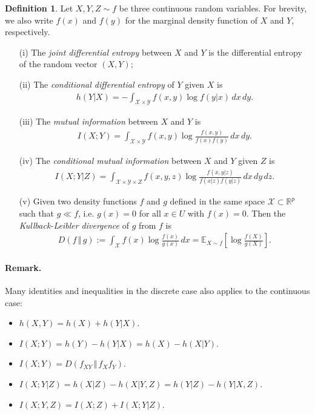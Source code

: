 \documentclass{article}
\numberwithin{equation}{section}
\newcommand{\E}{\mathbb{E}}
\newcommand{\bbR}{\mathbb{R}}
\renewcommand{\cal}{\mathcal}
\theoremstyle{plain}
\theoremstyle{definition}
\newtheorem{definition}[theorem]{Definition}
\begin{document}
\begin{definition}
Let $X,Y,Z\sim f$ be three continuous random variables. For brevity, we also write $f(x)$ and $f(y)$ for the marginal density function of $X$ and $Y$, respectively.
\begin{itemize}
\item[(i)] The \textit{joint differential entropy} between $X$ and $Y$ is the differential entropy of the random vector $(X,Y)$;
\item[(ii)] The \textit{conditional differential entropy} of $Y$ given $X$ is
\begin{align*}
	h(Y|X)=-\int_{\cal{X}\times\cal{Y}}f(x,y)\log f(y|x)\,dx\,dy.
\end{align*}
\item[(iii)] The \textit{mutual information} between $X$ and $Y$ is
\begin{align*}
	I(X;Y)=\int_{\cal{X}\times\cal{Y}}f(x,y)\log\frac{f(x,y)}{f(x)f(y)}\,dx\,dy.
\end{align*}
\item[(iv)] The \textit{conditional mutual information} between $X$ and $Y$ given $Z$ is
\begin{align*}
	I(X;Y|Z)=\int_{\cal{X}\times\cal{Y}\times{Z}}f(x,y,z)\log\frac{f(x,y|z)}{f(x|z)f(y|z)}\,dx\,dy\,dz.
\end{align*}
\item[(v)] Given two density functions $f$ and $g$ defined in the same space $\cal{X}\subset\bbR^p$ such that $g\ll f$, i.e. $g(x)=0$ for all $x\in U$ with $f(x)=0$. Then the \textit{Kullback-Leibler divergence} of $g$ from $f$  is
\begin{align*}
	D(f\,\Vert\,g):=\int_\cal{X}f(x)\log\frac{f(x)}{g(x)}\,dx=\E_{X\sim f}\left[\log\frac{f(X)}{g(X)}\right].
\end{align*}
\end{itemize}
\end{definition}
\paragraph{Remark.} Many identities and inequalities in the discrete case also applies to the continuous case:
\begin{itemize}
\item $h(X,Y)=h(X)+h(Y|X)$.
\item $I(X;Y)=h(Y)-h(Y|X)=h(X)-h(X|Y)$.
\item $I(X;Y)=D(f_{XY}\,\Vert\, f_Xf_Y)$.
\item $I(X;Y|Z)=h(X|Z)-h(X|Y,Z)=h(Y|Z)-h(Y|X,Z)$.
\item $I(X;Y,Z)=I(X;Z)+I(X;Y|Z)$.
\end{itemize}
\end{document}
